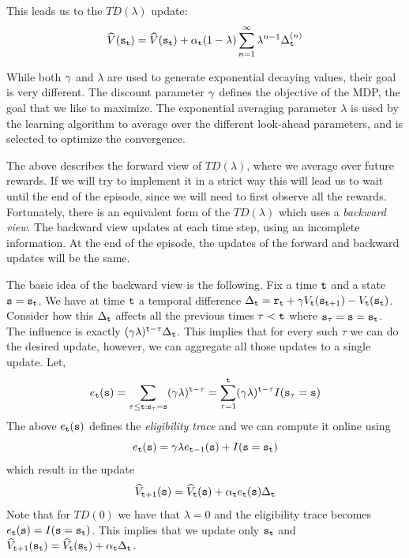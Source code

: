 This leads us to the $TD(\lambda)$ update:
\[
\widehat{V}({\tt s}_{\tt t})=\widehat{V}({\tt s}_{\tt t})+\alpha_{\tt t}(1-\lambda)\sum_{n=1}^\infty
\lambda^{n-1}\Delta^{(n)}_{\tt t}
\]

 While both $\gamma$ and $\lambda$ are used
to generate exponential decaying values, their goal is very
different. The discount parameter $\gamma$ defines the objective
of the MDP, the goal that we like to maximize. The exponential
averaging parameter $\lambda$ is used by the learning algorithm to average over the different
look-ahead parameters, and is selected to optimize the convergence.


The above describes the forward view of $TD(\lambda)$, where we
average over future rewards. If we will try to implement it in a
strict way this will lead us to wait until the end of the episode,
since we will need to first observe all the rewards. Fortunately,
there is an equivalent form of the $TD(\lambda)$ which uses a {\em
backward view}. The backward view updates at each time step, using
an incomplete information. At the end of the episode, the updates of
the forward and backward updates will be the same.

The basic idea of the backward view is the following. Fix a time
${\tt t}$ and a state ${\tt s}={\tt s}_{\tt t}$. We have at time
${\tt t}$ a temporal difference $\Delta_{\tt t}= {\tt r}_{\tt t}
+\gamma V_{\tt t}({\tt s}_{{\tt t}+1})-V_{\tt t}({\tt s}_{\tt t})$.
Consider how this $\Delta_{\tt t}$ affects all the previous times
$\tau<{\tt t}$ where ${\tt s}_\tau={\tt s}={\tt s}_{\tt t}$. The influence is
exactly $(\gamma\lambda)^{{\tt t}-\tau}\Delta_{\tt t}$. This implies
that for every such $\tau$ we can do the desired update, however, we
can aggregate all those updates to a single update. Let,
\[
e_{\tt t}({\tt s})=\sum_{\tau\leq {\tt t}: {\tt s}_\tau={\tt s}}
(\gamma\lambda)^{{\tt t}-\tau} = \sum_{\tau=1}^{\tt t}
(\gamma\lambda)^{{\tt t}-\tau}I({\tt s}_\tau={\tt s})
\]
The above $e_{\tt t}({\tt s})$ defines the {\em eligibility trace} and
we can compute it online using
\[
e_{\tt t}({\tt s})=\gamma\lambda
e_{{\tt t}-1}({\tt s})+I({\tt s}={\tt s}_{\tt t})
\]
which result in the update
\[
\widehat{V}_{{\tt t}+1}({\tt s})=\widehat{V}_{\tt t}({\tt s})+\alpha_{\tt t}
e_{\tt t}({\tt s})\Delta_{\tt t}
\]
Note that for $TD(0)$ we have that $\lambda=0$ and the eligibility
trace becomes $e_{\tt t}({\tt s})=I({\tt s}={\tt s}_{\tt t})$. This
implies that we update only ${\tt s}_{\tt t}$ and
$\widehat{V}_{{\tt t}+1}({\tt s}_{\tt t})=\widehat{V}_{\tt t}({\tt s}_{\tt t})+\alpha_{\tt t}
\Delta_{\tt t}$.

